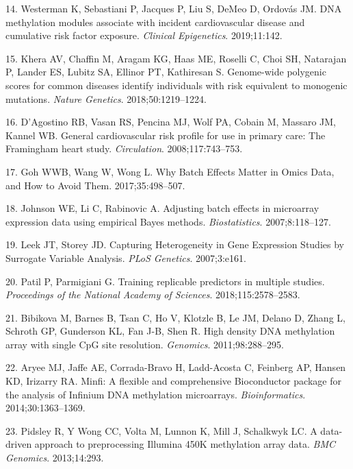 \documentclass[]{article}
\begin{document}
\leavevmode\hypertarget{ref-Westerman2019}{}%
14. Westerman K, Sebastiani P, Jacques P, Liu S, DeMeo D, Ordovás JM.
DNA methylation modules associate with incident cardiovascular disease
and cumulative risk factor exposure. \emph{Clinical Epigenetics}.
2019;11:142.

\leavevmode\hypertarget{ref-Khera2018}{}%
15. Khera AV, Chaffin M, Aragam KG, Haas ME, Roselli C, Choi SH,
Natarajan P, Lander ES, Lubitz SA, Ellinor PT, Kathiresan S. Genome-wide
polygenic scores for common diseases identify individuals with risk
equivalent to monogenic mutations. \emph{Nature Genetics}.
2018;50:1219--1224.

\leavevmode\hypertarget{ref-DAgostino2008}{}%
16. D'Agostino RB, Vasan RS, Pencina MJ, Wolf PA, Cobain M, Massaro JM,
Kannel WB. General cardiovascular risk profile for use in primary care:
The Framingham heart study. \emph{Circulation}. 2008;117:743--753.

\leavevmode\hypertarget{ref-Goh2017}{}%
17. Goh WWB, Wang W, Wong L. Why Batch Effects Matter in Omics Data, and
How to Avoid Them. 2017;35:498--507.

\leavevmode\hypertarget{ref-Johnson2007}{}%
18. Johnson WE, Li C, Rabinovic A. Adjusting batch effects in microarray
expression data using empirical Bayes methods. \emph{Biostatistics}.
2007;8:118--127.

\leavevmode\hypertarget{ref-Leek2007}{}%
19. Leek JT, Storey JD. Capturing Heterogeneity in Gene Expression
Studies by Surrogate Variable Analysis. \emph{PLoS Genetics}.
2007;3:e161.

\leavevmode\hypertarget{ref-Patil2018}{}%
20. Patil P, Parmigiani G. Training replicable predictors in multiple
studies. \emph{Proceedings of the National Academy of Sciences}.
2018;115:2578--2583.

\leavevmode\hypertarget{ref-Bibikova2011}{}%
21. Bibikova M, Barnes B, Tsan C, Ho V, Klotzle B, Le JM, Delano D,
Zhang L, Schroth GP, Gunderson KL, Fan J-B, Shen R. High density DNA
methylation array with single CpG site resolution. \emph{Genomics}.
2011;98:288--295.

\leavevmode\hypertarget{ref-Aryee2014}{}%
22. Aryee MJ, Jaffe AE, Corrada-Bravo H, Ladd-Acosta C, Feinberg AP,
Hansen KD, Irizarry RA. Minfi: A flexible and comprehensive Bioconductor
package for the analysis of Infinium DNA methylation microarrays.
\emph{Bioinformatics}. 2014;30:1363--1369.

\leavevmode\hypertarget{ref-Pidsley2013}{}%
23. Pidsley R, Y Wong CC, Volta M, Lunnon K, Mill J, Schalkwyk LC. A
data-driven approach to preprocessing Illumina 450K methylation array
data. \emph{BMC Genomics}. 2013;14:293.
\end{document}
